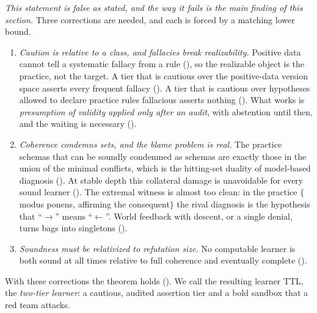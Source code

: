 \emph{This statement is false as stated, and the way it fails is the main finding of this section.} Three corrections are needed, and each is forced by a matching lower bound.
\begin{enumerate}[label=\arabic*.,leftmargin=*]
\item \emph{Caution is relative to a class, and fallacies break realizability.} Positive data cannot tell a systematic fallacy from a rule (), so the realizable object is the practice, not the target. A tier that is cautious over the positive-data version space asserts every frequent fallacy (). A tier that is cautious over hypotheses allowed to declare practice rules fallacious asserts nothing (). What works is \emph{presumption of validity applied only after an audit}, with abstention until then, and the waiting is necessary ().
\item \emph{Coherence condemns sets, and the blame problem is real.} The practice schemas that can be soundly condemned as schemas are exactly those in the union of the minimal conflicts, which is the hitting-set duality of model-based diagnosis (). At stable depth this collateral damage is unavoidable for every sound learner (). The extremal witness is almost too clean: in the practice $\{$modus ponens, affirming the consequent$\}$ the rival diagnosis is the hypothesis that ``$\to$'' means ``$\leftarrow$''. World feedback with descent, or a single denial, turns bags into singletons ().
\item \emph{Soundness must be relativized to refutation size.} No computable learner is both sound at all times relative to full coherence and eventually complete ().
\end{enumerate}
With these corrections the theorem holds (). We call the resulting learner TTL, the \emph{two-tier learner}: a cautious, audited assertion tier and a bold sandbox that a red team attacks.

